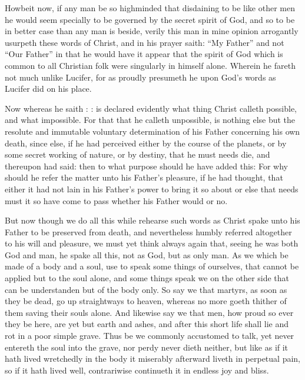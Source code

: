 \documentclass[a5paper]{scrbook}
\begin{document}
	Howbeit now, if any man be so highminded that disdaining to be like other men he would seem specially to be governed by the secret spirit of God, and so to be in better case than any man is beside, verily this man in mine opinion arrogantly usurpeth these words of Christ, and in his prayer saith: ``My Father'' and not ``Our Father'' in that he would have it appear that the spirit of God which is common to all Christian folk were singularly in himself alone. Wherein he fareth not much unlike Lucifer, for as proudly presumeth he upon God's words as Lucifer did on his place.
	
	Now whereas he saith : : is declared evidently what thing Christ calleth possible, and what impossible. For that that he calleth unpossible, is nothing else but the resolute and immutable voluntary determination of his Father concerning his own death, since else, if he had perceived either by the course of the planets, or by some secret working of nature, or by destiny, that he must needs die, and thereupon had said:  then to what purpose should he have added this:  For why should he refer the matter unto his Father's pleasure, if he had thought, that either it had not lain in his Father's power to bring it so about or else that needs must it so have come to pass whether his Father would or no.
	
	But now though we do all this while rehearse such words as Christ spake unto his Father to be preserved from death, and nevertheless humbly referred altogether to his will and pleasure, we must yet think always again that, seeing he was both God and man, he spake all this, not as God, but as only man. As we which be made of a body and a soul, use to speak some things of ourselves, that cannot be applied but to the soul alone, and some things speak we on the other side that can be understanden but of the body only. So say we that martyrs, as soon as they be dead, go up straightways to heaven, whereas no more goeth thither of them saving their souls alone. And likewise say we that men, how proud so ever they be here, are yet but earth and ashes, and after this short life shall lie and rot in a poor simple grave. Thus be we commonly accustomed to talk, yet never entereth the soul into the grave, nor perdy never dieth neither, but like as if it hath lived wretchedly in the body it miserably afterward liveth in perpetual pain, so if it hath lived well, contrariwise continueth it in endless joy and bliss.
	
\end{document}
